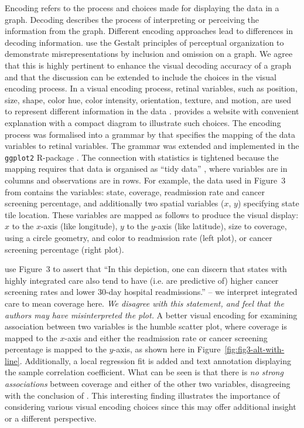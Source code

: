 \documentclass[ijds,nonblindrev]{informs-ijds}
\begin{document}
Encoding refers to the process and choices made for displaying the data in a graph. Decoding describes the process of interpreting or perceiving the information from the graph. Different encoding approaches lead to differences in decoding information. \citet{basole2021} use the Gestalt principles of perceptual organization to demonstrate misrepresentations by inclusion and omission on a graph. We agree that this is highly pertinent to enhance the visual decoding accuracy of a graph and that the discussion can be extended to include the choices in the visual encoding process. In a visual encoding process, retinal variables, such as position, size, shape, color hue, color intensity, orientation, texture, and motion, are used to represent different information in the data \citep{bertin1983semiology, munzner2014visualization}. \cite{graphworkflow} provides a website with convenient explanation with a compact diagram to illustrate such choices. The encoding process was formalised into a grammar by \citealp{Wilkinson2005-oz} that specifies the mapping of the data variables to retinal variables. The grammar was extended and implemented in the \texttt{ggplot2} R-package \citep{ggplot2}. The connection with statistics is tightened because the mapping requires that data is organised as ``tidy data'' \citep{tidyr}, where variables are in columns and observations are in rows. For example, the data used in Figure~3 from \citet{basole2021} contains the variables: state, coverage, readmission rate and cancer screening percentage, and additionally two spatial variables ($x$, $y$) specifying state tile location. These variables are mapped as follows to produce the visual display: $x$ to the $x$-axis (like longitude), $y$ to the $y$-axis (like latitude), size to coverage, using a circle geometry, and color to readmission rate (left plot), or cancer screening percentage (right plot).

\citet{basole2021} use Figure~3 to assert that ``In this depiction, one can discern that states with highly integrated care also tend to have (i.e. are predictive of) higher cancer screening rates and lower 30-day hospital readmissions.'' --  we interpret integrated care to mean coverage here. {\em We disagree with this statement, and feel that the authors may have misinterpreted the plot.} A better visual encoding for examining association between two variables is the humble scatter plot, where coverage is mapped to the $x$-axis and either the readmission rate or cancer screening percentage is mapped to the $y$-axis, as shown here in Figure~\ref{fig:fig3-alt-with-line}. Additionally, a local regression fit is added and text annotation displaying the sample correlation coefficient. What can be seen is that there is {\em no strong associations} between coverage and either of the other two variables, disagreeing with the conclusion of \citet{basole2021}. This interesting finding illustrates the importance of considering various visual encoding choices since this may offer additional insight or a different perspective.
\end{document}
